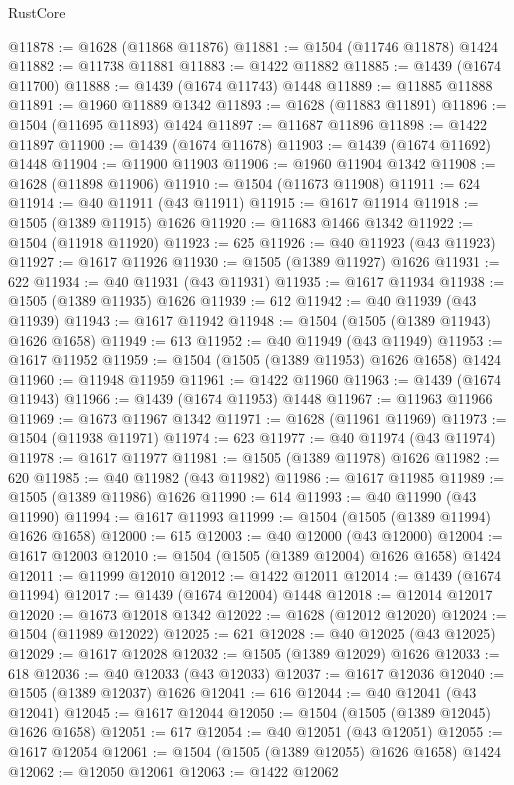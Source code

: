 \begin{lexlean}{RustCore}
\begin{coremodule}
@11878 := @1628 (@11868 @11876)
@11881 := @1504 (@11746 @11878) @1424
@11882 := @11738 @11881
@11883 := @1422 @11882
@11885 := @1439 (@1674 @11700)
@11888 := @1439 (@1674 @11743) @1448
@11889 := @11885 @11888
@11891 := @1960 @11889 @1342
@11893 := @1628 (@11883 @11891)
@11896 := @1504 (@11695 @11893) @1424
@11897 := @11687 @11896
@11898 := @1422 @11897
@11900 := @1439 (@1674 @11678)
@11903 := @1439 (@1674 @11692) @1448
@11904 := @11900 @11903
@11906 := @1960 @11904 @1342
@11908 := @1628 (@11898 @11906)
@11910 := @1504 (@11673 @11908)
@11911 := 624
@11914 := @40 @11911 (@43 @11911)
@11915 := @1617 @11914
@11918 := @1505 (@1389 @11915) @1626
@11920 := @11683 @1466 @1342
@11922 := @1504 (@11918 @11920)
@11923 := 625
@11926 := @40 @11923 (@43 @11923)
@11927 := @1617 @11926
@11930 := @1505 (@1389 @11927) @1626
@11931 := 622
@11934 := @40 @11931 (@43 @11931)
@11935 := @1617 @11934
@11938 := @1505 (@1389 @11935) @1626
@11939 := 612
@11942 := @40 @11939 (@43 @11939)
@11943 := @1617 @11942
@11948 := @1504 (@1505 (@1389 @11943) @1626 @1658)
@11949 := 613
@11952 := @40 @11949 (@43 @11949)
@11953 := @1617 @11952
@11959 := @1504 (@1505 (@1389 @11953) @1626 @1658) @1424
@11960 := @11948 @11959
@11961 := @1422 @11960
@11963 := @1439 (@1674 @11943)
@11966 := @1439 (@1674 @11953) @1448
@11967 := @11963 @11966
@11969 := @1673 @11967 @1342
@11971 := @1628 (@11961 @11969)
@11973 := @1504 (@11938 @11971)
@11974 := 623
@11977 := @40 @11974 (@43 @11974)
@11978 := @1617 @11977
@11981 := @1505 (@1389 @11978) @1626
@11982 := 620
@11985 := @40 @11982 (@43 @11982)
@11986 := @1617 @11985
@11989 := @1505 (@1389 @11986) @1626
@11990 := 614
@11993 := @40 @11990 (@43 @11990)
@11994 := @1617 @11993
@11999 := @1504 (@1505 (@1389 @11994) @1626 @1658)
@12000 := 615
@12003 := @40 @12000 (@43 @12000)
@12004 := @1617 @12003
@12010 := @1504 (@1505 (@1389 @12004) @1626 @1658) @1424
@12011 := @11999 @12010
@12012 := @1422 @12011
@12014 := @1439 (@1674 @11994)
@12017 := @1439 (@1674 @12004) @1448
@12018 := @12014 @12017
@12020 := @1673 @12018 @1342
@12022 := @1628 (@12012 @12020)
@12024 := @1504 (@11989 @12022)
@12025 := 621
@12028 := @40 @12025 (@43 @12025)
@12029 := @1617 @12028
@12032 := @1505 (@1389 @12029) @1626
@12033 := 618
@12036 := @40 @12033 (@43 @12033)
@12037 := @1617 @12036
@12040 := @1505 (@1389 @12037) @1626
@12041 := 616
@12044 := @40 @12041 (@43 @12041)
@12045 := @1617 @12044
@12050 := @1504 (@1505 (@1389 @12045) @1626 @1658)
@12051 := 617
@12054 := @40 @12051 (@43 @12051)
@12055 := @1617 @12054
@12061 := @1504 (@1505 (@1389 @12055) @1626 @1658) @1424
@12062 := @12050 @12061
@12063 := @1422 @12062

\end{coremodule}
\end{lexlean}
